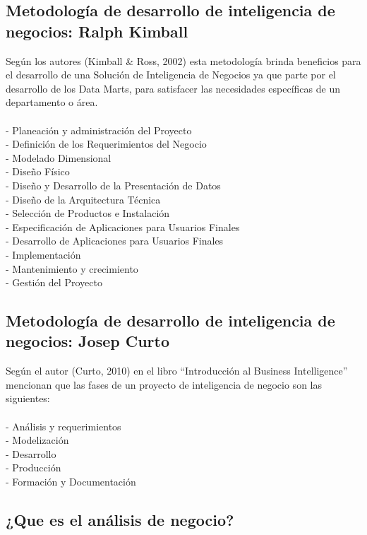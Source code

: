 \documentclass[twoside,twocolumn]{article}
\begin{document}
\subsection{Metodología de desarrollo de inteligencia de negocios: Ralph Kimball}
Según los autores (Kimball & Ross, 2002) esta metodología brinda
beneficios para el desarrollo de una Solución de Inteligencia de
Negocios ya que parte por el desarrollo de los Data Marts, para
satisfacer las necesidades específicas de un departamento o área.\\\\
- Planeación y administración del Proyecto\\
- Definición de los Requerimientos del Negocio\\
- Modelado Dimensional\\
- Diseño Físico\\
- Diseño y Desarrollo de la Presentación de Datos\\
- Diseño de la Arquitectura Técnica\\
- Selección de Productos e Instalación\\
- Especificación de Aplicaciones para Usuarios Finales\\
- Desarrollo de Aplicaciones para Usuarios Finales\\
- Implementación\\
- Mantenimiento y crecimiento\\
- Gestión del Proyecto\\

\subsection{Metodología de desarrollo de inteligencia de negocios: Josep Curto}
Según el autor (Curto, 2010) en el libro “Introducción al Business
Intelligence” mencionan que las fases de un proyecto de inteligencia
de negocio son las siguientes:\\\\
-  Análisis y requerimientos\\
- Modelización\\
- Desarrollo\\
- Producción\\
- Formación y Documentación

\subsection{¿Que es el análisis de negocio?}
\end{document}
